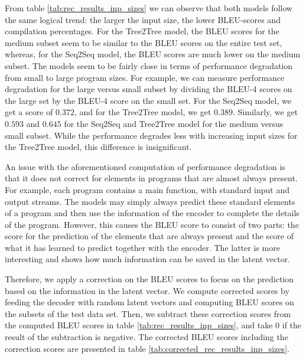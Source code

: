 From table \ref{tab:rec_results_inp_sizes} we can observe that both models follow the same logical trend: the larger the input size, the lower BLEU-scores and compilation percentages. For the Tree2Tree model, the BLEU scores for the medium subset seem to be similar to the BLEU scores on the entire test set, whereas, for the Seq2Seq model, the BLEU scores are much lower on the medium subset. The models seem to be fairly close in terms of performance degradation from small to large program sizes. For example, we can measure performance degradation for the large versus small subset by dividing the BLEU-4 scores on the large set by the BLEU-4 score on the small set. For the Seq2Seq model, we get a score of $0.372$, and for the Tree2Tree model, we get $0.389$. Similarly, we get $0.593$ and $0.645$ for the Seq2Seq and Tree2Tree model for the medium versus small subset. While the performance degrades less with increasing input sizes for the Tree2Tree model, this difference is insignificant. 



An issue with the aforementioned computation of performance degradation is that it does not correct for elements in programs that are almost always present. For example, each program contains a main function, with standard input and output streams. The models may simply always predict these standard elements of a program and then use the information of the encoder to complete the details of the program. However, this causes the BLEU score to consist of two parts: the score for the prediction of the elements that are always present and the score of what it has learned to predict together with the encoder. The latter is more interesting and shows how much information can be saved in the latent vector. 



Therefore, we apply a correction on the BLEU scores to focus on the prediction based on the information in the latent vector. We compute corrected scores by feeding the decoder with random latent vectors and computing BLEU scores on the subsets of the test data set. Then, we subtract these correction scores from the computed BLEU scores in table \ref{tab:rec_results_inp_sizes}, and take 0 if the result of the subtraction is negative. The corrected BLEU scores including the correction scores are presented in table \ref{tab:corrected_rec_results_inp_sizes}.

